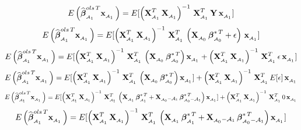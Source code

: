 \documentclass[11pt]{report}
\newcommand{\bfmath}[1]{\mbox{\boldmath$#1$\unboldmath}}
\begin{document}
\begin{enumerate}
$$E\left( \widehat{\bfmath{\beta}}^{ols\,T}_{_{\mathcal{A}_1}}\mathbf{x}_{_{\mathcal{A}_1}}\,\right) = E[\left( \mathbf{X}^{T}_{_{\mathcal{A}_1}}\,\mathbf{X}_{_{\mathcal{A}_1}}\right)^{-1}\,\mathbf{X}^{T}_{_{\mathcal{A}_1}}\,\mathbf{Y}\,\mathbf{x}_{_{\mathcal{A}_1}}] $$
$$E\left( \widehat{\bfmath{\beta}}^{ols\,T}_{_{\mathcal{A}_1}}\mathbf{x}_{_{\mathcal{A}_1}}\,\right) = E[\left( \mathbf{X}^{T}_{_{\mathcal{A}_1}}\,\mathbf{X}_{_{\mathcal{A}_1}}\right)^{-1}\,\mathbf{X}^{T}_{_{\mathcal{A}_1}}\,\left(\mathbf{X}_{_{\mathcal{A}_0}}\,\bfmath{\beta}^{\ast\,T}_{_{\mathcal{A}_0}}+\mathbf{\epsilon} \right)\,\mathbf{x}_{_{\mathcal{A}_1}}] $$
$$E\left( \widehat{\bfmath{\beta}}^{ols\,T}_{_{\mathcal{A}_1}}\mathbf{x}_{_{\mathcal{A}_1}}\,\right) = E[\left( \mathbf{X}^{T}_{_{\mathcal{A}_1}}\,\mathbf{X}_{_{\mathcal{A}_1}}\right)^{-1}\,\mathbf{X}^{T}_{_{\mathcal{A}_1}}\,\left(\mathbf{X}_{_{\mathcal{A}_0}}\,\bfmath{\beta}^{\ast\,T}_{_{\mathcal{A}_0}}\right)\mathbf{x}_{_{\mathcal{A}_1}} +\left( \mathbf{X}^{T}_{_{\mathcal{A}_1}}\,\mathbf{X}_{_{\mathcal{A}_1}}\right)^{-1}\,\mathbf{X}^{T}_{_{\mathcal{A}_1}}\,\mathbf{\epsilon} \,\mathbf{x}_{_{\mathcal{A}_1}}] $$
$$E\left( \widehat{\bfmath{\beta}}^{ols\,T}_{_{\mathcal{A}_1}}\mathbf{x}_{_{\mathcal{A}_1}}\,\right) = E[\left( \mathbf{X}^{T}_{_{\mathcal{A}_1}}\,\mathbf{X}_{_{\mathcal{A}_1}}\right)^{-1}\,\mathbf{X}^{T}_{_{\mathcal{A}_1}}\,\left(\mathbf{X}_{_{\mathcal{A}_0}}\,\bfmath{\beta}^{\ast\,T}_{_{\mathcal{A}_0}}\right)\mathbf{x}_{_{\mathcal{A}_1}}] + \left( \mathbf{X}^{T}_{_{\mathcal{A}_1}}\,\mathbf{X}_{_{\mathcal{A}_1}}\right)^{-1}\,\mathbf{X}^{T}_{_{\mathcal{A}_1}}\,E[\mathbf{\epsilon}] \,\mathbf{x}_{_{\mathcal{A}_1}} $$
$$E\left( \widehat{\bfmath{\beta}}^{ols\,T}_{_{\mathcal{A}_1}}\mathbf{x}_{_{\mathcal{A}_1}}\,\right) = E[\left( \mathbf{X}^{T}_{_{\mathcal{A}_1}}\,\mathbf{X}_{_{\mathcal{A}_1}}\right)^{-1}\,\mathbf{X}^{T}_{_{\mathcal{A}_1}}\,\left(\mathbf{X}_{_{\mathcal{A}_1}}\,\bfmath{\beta}^{\ast\,T}_{_{\mathcal{A}_1}} + \mathbf{X}_{_{\mathcal{A}_0} - \mathcal{A}_1}\,\bfmath{\beta}^{\ast\,T}_{_{\mathcal{A}_0} - \mathcal{A}_1}\right)\mathbf{x}_{_{\mathcal{A}_1}}] + \left( \mathbf{X}^{T}_{_{\mathcal{A}_1}}\,\mathbf{X}_{_{\mathcal{A}_1}}\right)^{-1}\,\mathbf{X}^{T}_{_{\mathcal{A}_1}}\,0 \,\mathbf{x}_{_{\mathcal{A}_1}} $$
$$E\left( \widehat{\bfmath{\beta}}^{ols\,T}_{_{\mathcal{A}_1}}\mathbf{x}_{_{\mathcal{A}_1}}\,\right) = E[\left( \mathbf{X}^{T}_{_{\mathcal{A}_1}}\,\mathbf{X}_{_{\mathcal{A}_1}}\right)^{-1}\,\mathbf{X}^{T}_{_{\mathcal{A}_1}}\,\left(\mathbf{X}_{_{\mathcal{A}_1}}\,\bfmath{\beta}^{\ast\,T}_{_{\mathcal{A}_1}} + \mathbf{X}_{_{\mathcal{A}_0} - \mathcal{A}_1}\,\bfmath{\beta}^{\ast\,T}_{_{\mathcal{A}_0} - \mathcal{A}_1}\right)\mathbf{x}_{_{\mathcal{A}_1}}]$$

\end{enumerate}
\end{document}
